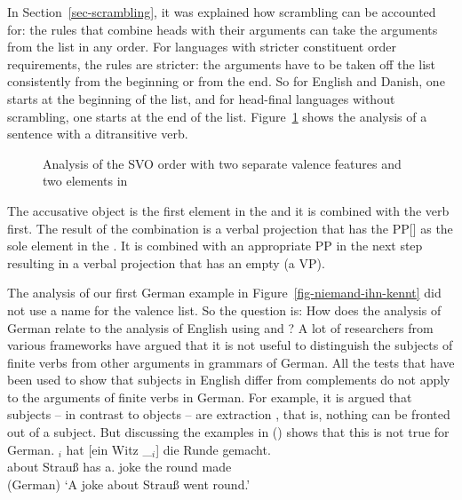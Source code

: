 In Section~\ref{sec-scrambling}, it was explained how scrambling can be accounted for: the rules that
combine heads with their arguments can take the arguments from the list in any order. For languages
with stricter constituent order requirements, the rules are stricter: the arguments have to be taken
off the list consistently from the beginning or from the end. So for English and Danish, one starts
at the beginning of the list, and for head-final languages without scrambling, one starts at the end
of the list. Figure~\ref{fig-svo-ditrans} shows the analysis of a sentence with a ditransitive verb.
\begin{figure}
\caption{\label{fig-svo-ditrans}Analysis of the SVO order with two separate valence features and two
  elements in \comps}
\end{figure}
The accusative object is the first element in the \compsl and it is combined with the verb
first. The result of the combination is a verbal projection that has the PP[] as the sole
element in the \compsl. It is combined with an appropriate PP in the next step resulting in a verbal
projection that has an empty \compsl (a VP).


The analysis of our first German example in Figure~\ref{fig-niemand-ihn-kennt} did not use a name
for the valence list. So the question is: How does the analysis of German relate to the analysis of
English using \spr and \comps? A lot of researchers from various frameworks have argued that it is not
useful to distinguish the subjects of finite verbs from other arguments in grammars of German. All the tests that have
been used to show that subjects in English differ from complements do not apply to the arguments of
finite verbs in German. For example, it is argued that subjects – in contrast to objects – are
extraction  \parencites[--250]{Chomsky73a}[]{Fanselow87a}[--36]{Grewendorf89a}, that is, nothing can be
fronted out of a subject. But \citet[]{Haider93a} discussing the examples in () shows that this is not true for
German.
\eal
\ex 
{}$_i$ hat [ein        Witz \_$_i$] die Runde gemacht.\\
     \spacebr{}about Strauß      has \spacebr{}a.\NOM{} joke {}      the round made\\\hfill(German)
\glt `A joke about Strauß went round.'

